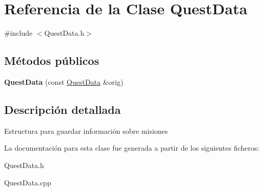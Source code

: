 \hypertarget{classQuestData}{}\section{Referencia de la Clase Quest\+Data}
\label{classQuestData}


{\ttfamily \#include $<$Quest\+Data.\+h$>$}

\subsection*{Métodos públicos}
\begin{DoxyCompactItemize}
\item 
\hypertarget{classQuestData_a0ba8fcf790c42a18444ee458c4b2d8b0}{}{\bfseries Quest\+Data} (const \hyperlink{classQuestData}{Quest\+Data} \&orig)\label{classQuestData_a0ba8fcf790c42a18444ee458c4b2d8b0}

\end{DoxyCompactItemize}


\subsection{Descripción detallada}
Estructura para guardar información sobre misiones 

La documentación para esta clase fue generada a partir de los siguientes ficheros\+:\begin{DoxyCompactItemize}
\item 
Quest\+Data.\+h\item 
Quest\+Data.\+cpp\end{DoxyCompactItemize}
